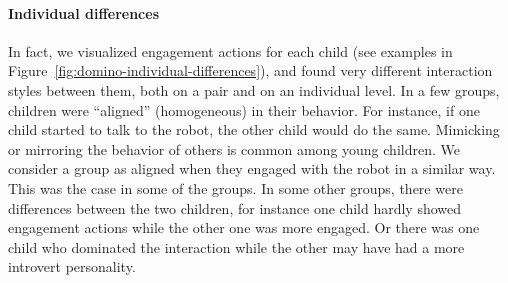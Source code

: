 \documentclass{sig-alternate}
\begin{document}
%    


\paragraph{Individual differences}	

In fact, we visualized engagement actions for each child (see examples in
Figure~\ref{fig:domino-individual-differences}), and found very different
interaction styles between them, both on a pair and on an individual level. In a
few groups, children were ``aligned'' (homogeneous) in their behavior. For
instance, if one child started to talk to the robot, the other child would do
the same. Mimicking or mirroring the behavior of others is common among young
children. We consider a group as aligned when they engaged with the robot in a
similar way. This was the case in some of the groups. In some other groups,
there were differences between the two children, for instance one child hardly
showed engagement actions while the other one was more engaged. Or there was one
child who dominated the interaction while the other may have had a more
introvert personality.
\end{document}
